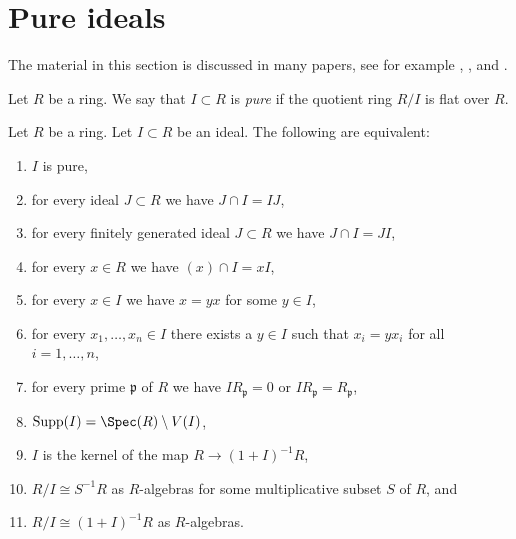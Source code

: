 \section{Pure ideals}
\label{section-pure-ideals}

\noindent
The material in this section is discussed in many papers, see for example
\cite{Lazard}, \cite{Bkouche}, and \cite{DeMarco}.

\begin{definition}
\label{definition-pure-ideal}
Let $R$ be a ring. We say that $I \subset R$ is {\it pure}
if the quotient ring $R/I$ is flat over $R$.
\end{definition}

\begin{lemma}
\label{lemma-pure}
Let $R$ be a ring.
Let $I \subset R$ be an ideal.
The following are equivalent:
\begin{enumerate}
\item $I$ is pure,
\item for every ideal $J \subset R$ we have $J \cap I = IJ$,
\item for every finitely generated ideal $J \subset R$ we have
$J \cap I = JI$,
\item for every $x \in R$ we have $(x) \cap I = xI$,
\item for every $x \in I$ we have $x = yx$ for some $y \in I$,
\item for every $x_1, \ldots, x_n \in I$ there exists a
$y \in I$ such that $x_i = yx_i$ for all $i = 1, \ldots, n$,
\item for every prime $\mathfrak p$ of $R$ we have
$IR_{\mathfrak p} = 0$ or $IR_{\mathfrak p} = R_{\mathfrak p}$,
\item $\text{Supp}(I) = \Spec(R) \setminus V(I)$,
\item $I$ is the kernel of the map $R \to (1 + I)^{-1}R$,
\item $R/I \cong S^{-1}R$ as $R$-algebras for some multiplicative
subset $S$ of $R$, and
\item $R/I \cong (1 + I)^{-1}R$ as $R$-algebras.
\end{enumerate}
\end{lemma}

